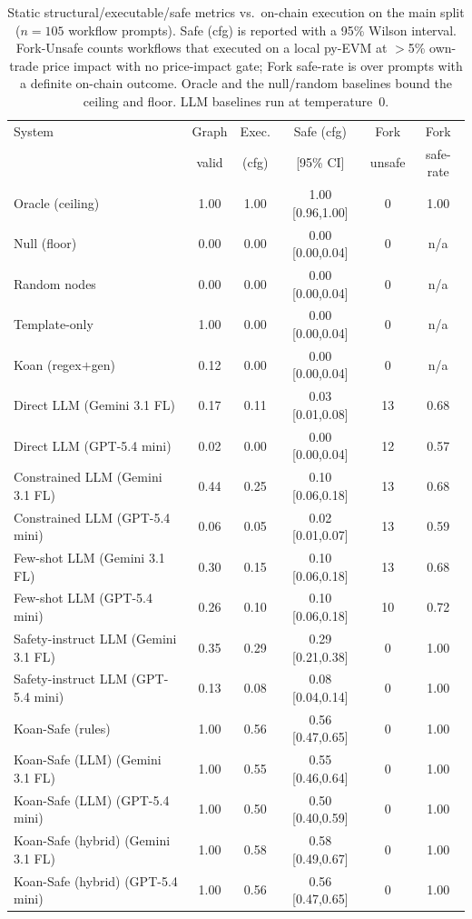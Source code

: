 \begin{table}[t]
\centering
\caption{Static structural/executable/safe metrics vs.\ on-chain execution on the main split (${n{=}105}$ workflow prompts). Safe (cfg) is reported with a 95\% Wilson interval. Fork-Unsafe counts workflows that executed on a local py-EVM at $>$5\% own-trade price impact with no price-impact gate; Fork safe-rate is over prompts with a definite on-chain outcome. Oracle and the null/random baselines bound the ceiling and floor. LLM baselines run at temperature~0.}
\label{tab:main-results}
\begin{tabular}{lccccc}
\toprule
System & Graph & Exec. & Safe (cfg) & Fork & Fork \\
       & valid & (cfg) & [95\% CI] & unsafe & safe-rate \\
\midrule
Oracle (ceiling) & 1.00 & 1.00 & 1.00 [0.96,1.00] & 0 & 1.00 \\
Null (floor) & 0.00 & 0.00 & 0.00 [0.00,0.04] & 0 & n/a \\
Random nodes & 0.00 & 0.00 & 0.00 [0.00,0.04] & 0 & n/a \\
Template-only & 1.00 & 0.00 & 0.00 [0.00,0.04] & 0 & n/a \\
Koan (regex$+$gen) & 0.12 & 0.00 & 0.00 [0.00,0.04] & 0 & n/a \\
Direct LLM (Gemini 3.1 FL) & 0.17 & 0.11 & 0.03 [0.01,0.08] & 13 & 0.68 \\
Direct LLM (GPT-5.4 mini) & 0.02 & 0.00 & 0.00 [0.00,0.04] & 12 & 0.57 \\
Constrained LLM (Gemini 3.1 FL) & 0.44 & 0.25 & 0.10 [0.06,0.18] & 13 & 0.68 \\
Constrained LLM (GPT-5.4 mini) & 0.06 & 0.05 & 0.02 [0.01,0.07] & 13 & 0.59 \\
Few-shot LLM (Gemini 3.1 FL) & 0.30 & 0.15 & 0.10 [0.06,0.18] & 13 & 0.68 \\
Few-shot LLM (GPT-5.4 mini) & 0.26 & 0.10 & 0.10 [0.06,0.18] & 10 & 0.72 \\
Safety-instruct LLM (Gemini 3.1 FL) & 0.35 & 0.29 & 0.29 [0.21,0.38] & 0 & 1.00 \\
Safety-instruct LLM (GPT-5.4 mini) & 0.13 & 0.08 & 0.08 [0.04,0.14] & 0 & 1.00 \\
Koan-Safe (rules) & 1.00 & 0.56 & 0.56 [0.47,0.65] & 0 & 1.00 \\
Koan-Safe (LLM) (Gemini 3.1 FL) & 1.00 & 0.55 & 0.55 [0.46,0.64] & 0 & 1.00 \\
Koan-Safe (LLM) (GPT-5.4 mini) & 1.00 & 0.50 & 0.50 [0.40,0.59] & 0 & 1.00 \\
Koan-Safe (hybrid) (Gemini 3.1 FL) & 1.00 & 0.58 & 0.58 [0.49,0.67] & 0 & 1.00 \\
Koan-Safe (hybrid) (GPT-5.4 mini) & 1.00 & 0.56 & 0.56 [0.47,0.65] & 0 & 1.00 \\
\bottomrule
\end{tabular}
\end{table}
